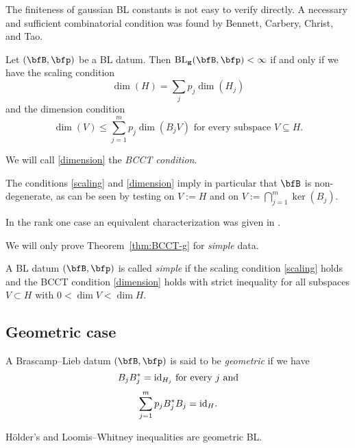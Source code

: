 The finiteness of gaussian BL constants is not easy to verify directly.
A necessary and sufficient combinatorial condition was found by Bennett, Carbery, Christ, and Tao.
\begin{theorem}[{\cite{MR2377493}}]
\label{thm:BCCT-g}
Let $(\bfB, \p)$ be a BL datum.
Then $\BLg(\bfB,\p) < \infty$ if and only if we have the scaling condition
\begin{equation}\label{scaling}
\dim(H) = \sum_j p_j \dim(H_j)
\end{equation}
and the dimension condition
\begin{equation}\label{dimension}
\dim(V) \leq \sum_{j=1}^m p_j \dim(B_j V) \text{ for every subspace } V \subseteq H.
\end{equation}
\end{theorem}
We will call \eqref{dimension} the \emph{BCCT condition}.
\begin{remark}
The conditions \eqref{scaling} and \eqref{dimension} imply in particular that $\bfB$ is non-degenerate, as can be seen by testing on $V:=H$ and on $V:=\bigcap_{j=1}^m \ker(B_j)$.
\end{remark}
In the rank one case an equivalent characterization was given in \cite{MR1650312}.

We will only prove Theorem~\ref{thm:BCCT-g} for \emph{simple} data.
\begin{definition}
A BL datum $(\bfB,\p)$ is called \emph{simple} if the scaling condition \eqref{scaling} holds and the BCCT condition \eqref{dimension} holds with strict inequality for all subspaces $V\subset H$ with $0 < \dim V < \dim H$.
\end{definition}

\subsection{Geometric case}\label{geom-sec}

\begin{definition} A Brascamp--Lieb datum $(\bfB,\p)$ is said to be \emph{geometric}
if we have
\begin{equation}
\label{eq:BB*=id}
B_j B_j^* = \mathrm{id}_{H_j}
\text{ for every } j \text{ and}
\end{equation}
\begin{equation}\label{pbb}
\sum_{j=1}^m p_j B_j^* B_j = \mathrm{id}_H.
\end{equation}
\end{definition}

\begin{example}
H\"older's and Loomis--Whitney inequalities are geometric BL.
\end{example}

